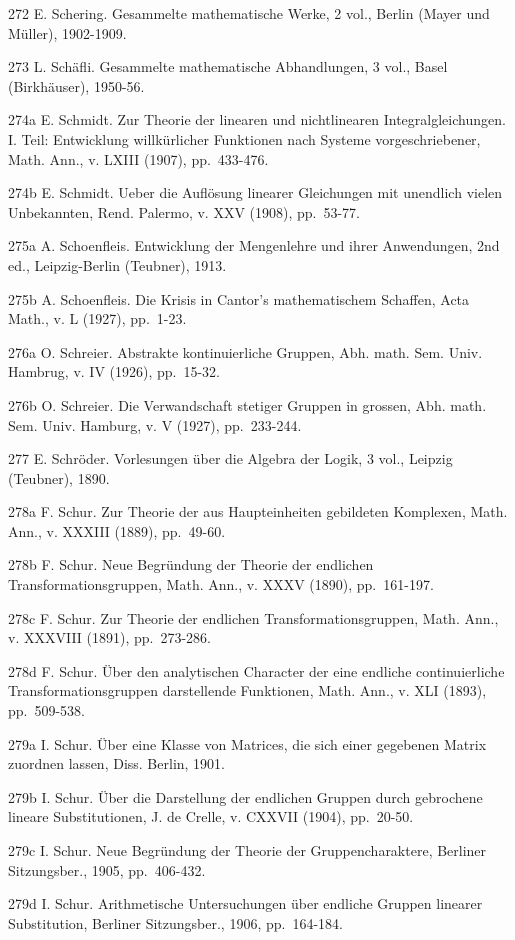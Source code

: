 272 E. Schering. Gesammelte mathematische Werke, 2 vol., Berlin (Mayer und Müller), 1902-1909.

273 L. Schäfli. Gesammelte mathematische Abhandlungen, 3 vol., Basel (Birkhäuser), 1950-56.

274a E. Schmidt. Zur Theorie der linearen und nichtlinearen Integralgleichungen. I. Teil: Entwicklung willkürlicher Funktionen nach Systeme vorgeschriebener, Math. Ann., v. LXIII (1907), pp.~433-476.

274b E. Schmidt. Ueber die Auflösung linearer Gleichungen mit unendlich vielen Unbekannten, Rend. Palermo, v. XXV (1908), pp.~53-77.

275a A. Schoenfleis. Entwicklung der Mengenlehre und ihrer Anwendungen, 2nd ed., Leipzig-Berlin (Teubner), 1913.

275b A. Schoenfleis. Die Krisis in Cantor's mathematischem Schaffen, Acta Math., v. L (1927), pp.~1-23.

276a O. Schreier. Abstrakte kontinuierliche Gruppen, Abh. math. Sem. Univ. Hambrug, v. IV (1926), pp.~15-32.

276b O. Schreier. Die Verwandschaft stetiger Gruppen in grossen, Abh. math. Sem. Univ. Hamburg, v. V (1927), pp.~233-244.

277 E. Schröder. Vorlesungen über die Algebra der Logik, 3 vol., Leipzig (Teubner), 1890.

278a F. Schur. Zur Theorie der aus Haupteinheiten gebildeten Komplexen, Math. Ann., v. XXXIII (1889), pp.~49-60.

278b F. Schur. Neue Begründung der Theorie der endlichen Transformationsgruppen, Math. Ann., v. XXXV (1890), pp.~161-197.

278c F. Schur. Zur Theorie der endlichen Transformationsgruppen, Math. Ann., v. XXXVIII (1891), pp.~273-286.

278d F. Schur. Über den analytischen Character der eine endliche continuierliche Transformationsgruppen darstellende Funktionen, Math. Ann., v. XLI (1893), pp.~509-538.

279a I. Schur. Über eine Klasse von Matrices, die sich einer gegebenen Matrix zuordnen lassen, Diss. Berlin, 1901.

279b I. Schur. Über die Darstellung der endlichen Gruppen durch gebrochene lineare Substitutionen, J. de Crelle, v. CXXVII (1904), pp.~20-50.

279c I. Schur. Neue Begründung der Theorie der Gruppencharaktere, Berliner Sitzungsber., 1905, pp.~406-432.

279d I. Schur. Arithmetische Untersuchungen über endliche Gruppen linearer Substitution, Berliner Sitzungsber., 1906, pp.~164-184.

